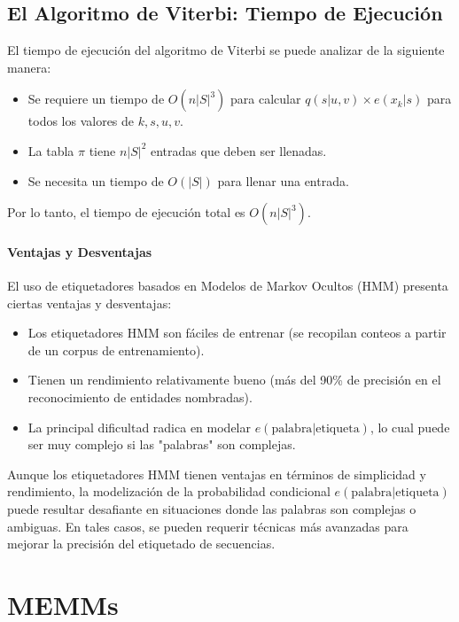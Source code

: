 \subsection{El Algoritmo de Viterbi: Tiempo de Ejecución}
El tiempo de ejecución del algoritmo de Viterbi se puede analizar de la siguiente manera:

\begin{itemize}
    \item Se requiere un tiempo de $O(n|S|^3)$ para calcular $q(s|u, v) \times e(x_k|s)$ para todos los valores de $k, s, u, v$.
    \item La tabla $\pi$ tiene $n|S|^2$ entradas que deben ser llenadas.
    \item Se necesita un tiempo de $O(|S|)$ para llenar una entrada.
\end{itemize}

Por lo tanto, el tiempo de ejecución total es $O(n|S|^3)$.

\paragraph{Ventajas y Desventajas}
El uso de etiquetadores basados en Modelos de Markov Ocultos (HMM) presenta ciertas ventajas y desventajas:

\begin{itemize}
    \item Los etiquetadores HMM son fáciles de entrenar (se recopilan conteos a partir de un corpus de entrenamiento).
    \item Tienen un rendimiento relativamente bueno (más del 90\% de precisión en el reconocimiento de entidades nombradas).
    \item La principal dificultad radica en modelar $e(\text{palabra} | \text{etiqueta})$, lo cual puede ser muy complejo si las "palabras" son complejas.
\end{itemize}

Aunque los etiquetadores HMM tienen ventajas en términos de simplicidad y rendimiento, la modelización de la probabilidad condicional $e(\text{palabra} | \text{etiqueta})$ puede resultar desafiante en situaciones donde las palabras son complejas o ambiguas. En tales casos, se pueden requerir técnicas más avanzadas para mejorar la precisión del etiquetado de secuencias.


\section{MEMMs}

